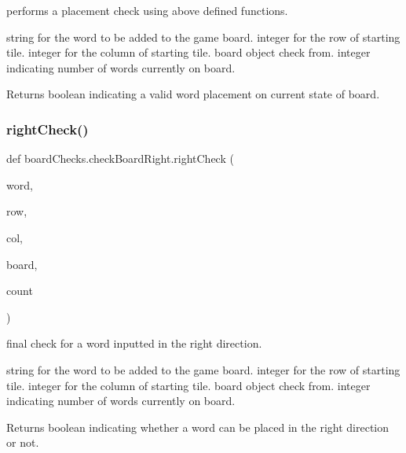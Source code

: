 performs a placement check using above defined functions. 

string for the word to be added to the game board.  integer for the row of starting tile.  integer for the column of starting tile.  board object check from.  integer indicating number of words currently on board. \begin{DoxyReturn}{Returns}
boolean indicating a valid word placement on current state of board. 
\end{DoxyReturn}
\mbox{\label{classboard_checks_1_1check_board_right_a0ea42c96718ef916ea9242b113abb49f}} 
\subsubsection{\texorpdfstring{right\+Check()}{rightCheck()}}
{\footnotesize\ttfamily def board\+Checks.\+check\+Board\+Right.\+right\+Check (\begin{DoxyParamCaption}\item[{}]{word,  }\item[{}]{row,  }\item[{}]{col,  }\item[{}]{board,  }\item[{}]{count }\end{DoxyParamCaption})}



final check for a word inputted in the right direction. 

string for the word to be added to the game board.  integer for the row of starting tile.  integer for the column of starting tile.  board object check from.  integer indicating number of words currently on board. \begin{DoxyReturn}{Returns}
boolean indicating whether a word can be placed in the right direction or not. 
\end{DoxyReturn}
\mbox{\label{classboard_checks_1_1check_board_right_a2c96a3e11772231852720539a8ac1430}} 
